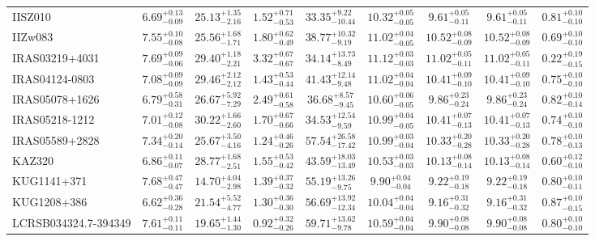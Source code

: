 \documentclass[onecolumn]{mn2e}
\begin{document}
{\begin{center}
\begin{longtable}{lcccccccc}
IISZ010 & $6.69_{-0.09}^{+0.13}$ & $25.13_{-2.16}^{+1.35}$ & $1.52_{-0.53}^{+0.71}$ &$33.35_{-10.44}^{+9.22}$ & $10.32_{-0.05}^{+0.05}$ & $9.61_{-0.11}^{+0.05}$ & $9.61_{-0.11}^{+0.05}$ & $0.81_{-0.10}^{+0.10}$ \\
IIZw083 & $7.55_{-0.08}^{+0.10}$ & $25.56_{-1.71}^{+1.68}$ & $1.80_{-0.49}^{+0.62}$ &$38.77_{-9.19}^{+10.32}$ & $11.02_{-0.05}^{+0.04}$ & $10.52_{-0.09}^{+0.08}$ & $10.52_{-0.09}^{+0.08}$ & $0.69_{-0.10}^{+0.10}$ \\
IRAS03219+4031 & $7.69_{-0.06}^{+0.09}$ & $29.40_{-2.21}^{+1.18}$ & $3.32_{-0.67}^{+0.67}$ &$34.14_{-8.49}^{+13.73}$ & $11.12_{-0.03}^{+0.03}$ & $11.02_{-0.11}^{+0.05}$ & $11.02_{-0.11}^{+0.05}$ & $0.22_{-0.15}^{+0.19}$ \\
IRAS04124-0803 & $7.08_{-0.09}^{+0.09}$ & $29.46_{-2.12}^{+2.12}$ & $1.43_{-0.44}^{+0.53}$ &$41.43_{-9.48}^{+12.14}$ & $11.02_{-0.04}^{+0.04}$ & $10.41_{-0.10}^{+0.09}$ & $10.41_{-0.10}^{+0.09}$ & $0.75_{-0.10}^{+0.10}$ \\
IRAS05078+1626 & $6.79_{-0.31}^{+0.58}$ & $26.67_{-7.29}^{+5.92}$ & $2.49_{-0.58}^{+0.61}$ &$36.68_{-9.45}^{+8.57}$ & $10.60_{-0.05}^{+0.06}$ & $9.86_{-0.24}^{+0.23}$ & $9.86_{-0.24}^{+0.23}$ & $0.82_{-0.14}^{+0.10}$ \\
IRAS05218-1212 & $7.01_{-0.08}^{+0.12}$ & $30.22_{-2.60}^{+1.66}$ & $1.70_{-0.66}^{+0.67}$ &$34.53_{-9.59}^{+12.54}$ & $10.99_{-0.05}^{+0.04}$ & $10.41_{-0.13}^{+0.07}$ & $10.41_{-0.13}^{+0.07}$ & $0.74_{-0.10}^{+0.10}$ \\
IRAS05589+2828 & $7.34_{-0.14}^{+0.20}$ & $25.67_{-4.16}^{+3.50}$ & $1.24_{-0.26}^{+0.46}$ &$57.54_{-17.42}^{+26.58}$ & $10.99_{-0.04}^{+0.03}$ & $10.33_{-0.28}^{+0.20}$ & $10.33_{-0.28}^{+0.20}$ & $0.78_{-0.13}^{+0.10}$ \\
KAZ320 & $6.86_{-0.07}^{+0.11}$ & $28.77_{-2.51}^{+1.68}$ & $1.55_{-0.42}^{+0.53}$ &$43.59_{-13.49}^{+18.03}$ & $10.53_{-0.03}^{+0.03}$ & $10.13_{-0.14}^{+0.08}$ & $10.13_{-0.14}^{+0.08}$ & $0.60_{-0.10}^{+0.12}$ \\
KUG1141+371 & $7.68_{-0.47}^{+0.47}$ & $14.70_{-2.98}^{+4.04}$ & $1.39_{-0.32}^{+0.37}$ &$55.19_{-9.75}^{+13.26}$ & $9.90_{-0.04}^{+0.04}$ & $9.22_{-0.18}^{+0.19}$ & $9.22_{-0.18}^{+0.19}$ & $0.80_{-0.11}^{+0.10}$ \\
KUG1208+386 & $6.62_{-0.28}^{+0.36}$ & $21.54_{-4.77}^{+5.52}$ & $1.30_{-0.30}^{+0.36}$ &$56.69_{-12.34}^{+13.92}$ & $10.04_{-0.04}^{+0.04}$ & $9.16_{-0.32}^{+0.31}$ & $9.16_{-0.32}^{+0.31}$ & $0.87_{-0.15}^{+0.10}$ \\
LCRSB034324.7-394349 & $7.61_{-0.11}^{+0.11}$ & $19.65_{-1.30}^{+1.44}$ & $0.92_{-0.26}^{+0.32}$ &$59.71_{-9.78}^{+13.62}$ & $10.59_{-0.04}^{+0.04}$ & $9.90_{-0.08}^{+0.08}$ & $9.90_{-0.08}^{+0.08}$ & $0.80_{-0.10}^{+0.10}$ \\

\end{longtable}
\end{center}}
\end{document}
